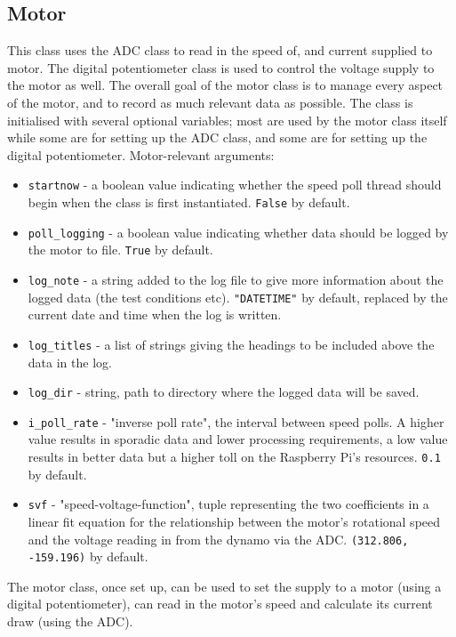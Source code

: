 \documentclass[twoside,a4]{report}
\def\br{\newline \newline \noindent}
\begin{document}
	\subsection*{Motor}
	This class uses the ADC class to read in the speed of, and current supplied to motor. The digital potentiometer class is used to control the voltage supply to the motor as well. The overall goal of the motor class is to manage every aspect of the motor, and to record as much relevant data as possible. 
	\br
	The class is initialised with several optional variables; most are used by the motor class itself while some are for setting up the ADC class, and some are for setting up the digital potentiometer.
	\br
	Motor-relevant arguments:
	\begin{itemize}
		\item \texttt{startnow} - a boolean value indicating whether the speed poll thread should begin when the class is first instantiated. \texttt{False} by default.
		\item \texttt{poll\_logging} - a boolean value indicating whether data should be logged by the motor to file. \texttt{True} by default.
		\item \texttt{log\_note} - a string added to the log file to give more information about the logged data (the test conditions etc). \texttt{"DATETIME"} by default, replaced by the current date and time when the log is written.
		\item \texttt{log\_titles} - a list of strings giving the headings to be included above the data in the log.
		\item \texttt{log\_dir} - string, path to directory where the logged data will be saved.
		\item \texttt{i\_poll\_rate} - "inverse poll rate", the interval between speed polls. A higher value results in sporadic data and lower processing requirements, a low value results in better data but a higher toll on the Raspberry Pi's resources. \texttt{0.1} by default.
		\item \texttt{svf} - "speed-voltage-function", tuple representing the two coefficients in a linear fit equation for the relationship between the motor's rotational speed and the voltage reading in from the dynamo via the ADC. \texttt{(312.806, -159.196)} by default.
	\end{itemize}
	The motor class, once set up, can be used to set the supply to a motor (using a digital potentiometer), can read in the motor's speed and calculate its current draw (using the ADC).
	
\end{document}
